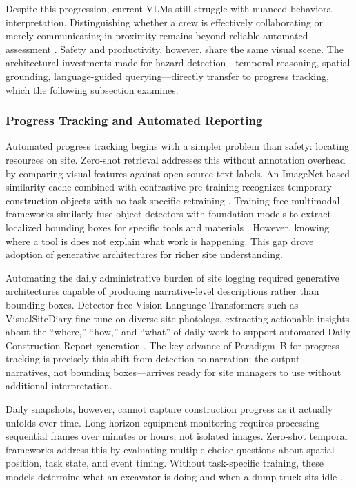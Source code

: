 \documentclass[10pt,letterpaper]{article}
\begin{document}
Despite this progression, current VLMs still struggle with nuanced behavioral interpretation. Distinguishing whether a crew is effectively collaborating or merely communicating in proximity remains beyond reliable automated assessment \cite{bui2026}. Safety and productivity, however, share the same visual scene. The architectural investments made for hazard detection---temporal reasoning, spatial grounding, language-guided querying---directly transfer to progress tracking, which the following subsection examines.

\subsubsection{Progress Tracking and Automated Reporting}

Automated progress tracking begins with a simpler problem than safety: locating resources on site. Zero-shot retrieval addresses this without annotation overhead by comparing visual features against open-source text labels. An ImageNet-based similarity cache combined with contrastive pre-training recognizes temporary construction objects with no task-specific retraining \cite{liang2024}. Training-free multimodal frameworks similarly fuse object detectors with foundation models to extract localized bounding boxes for specific tools and materials \cite{zhang2025}. However, knowing where a tool is does not explain what work is happening. This gap drove adoption of generative architectures for richer site understanding.

Automating the daily administrative burden of site logging required generative architectures capable of producing narrative-level descriptions rather than bounding boxes. Detector-free Vision-Language Transformers such as VisualSiteDiary fine-tune on diverse site photologs, extracting actionable insights about the ``where,'' ``how,'' and ``what'' of daily work to support automated Daily Construction Report generation \cite{jung2024}. The key advance of Paradigm~B for progress tracking is precisely this shift from detection to narration: the output---narratives, not bounding boxes---arrives ready for site managers to use without additional interpretation.

Daily snapshots, however, cannot capture construction progress as it actually unfolds over time. Long-horizon equipment monitoring requires processing sequential frames over minutes or hours, not isolated images. Zero-shot temporal frameworks address this by evaluating multiple-choice questions about spatial position, task state, and event timing. Without task-specific training, these models determine what an excavator is doing and when a dump truck sits idle \cite{jeoung2025}.
\end{document}
